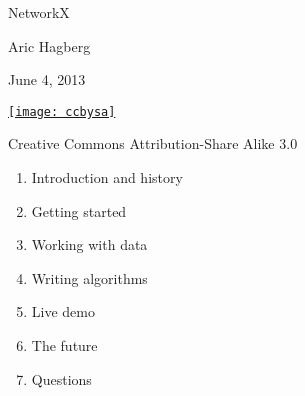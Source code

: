 \documentclass[xcolor=dvipsnames, 9pt]{beamer}
\begin{document}
\begin{frame}[plain]
\begin{center}

{\fontsize{50}{60}\selectfont 
{\color{title} NetworkX}}
\vspace{2cm}

{\fontsize{20}{25}\selectfont Aric Hagberg}
\vspace{0.2cm}

{\Large June 4, 2013}
\vspace{1cm}

\end{center}
\small
\href{http://creativecommons.org/licenses/by-sa/3.0/us/}{\texttt{[image: ccbysa]}}

Creative Commons Attribution-Share Alike 3.0 
\end{frame}

\begin{frame}


\LARGE
\begin{enumerate}
\item Introduction and history
\item Getting started
\item Working with data
\item Writing algorithms
\item Live demo
\item The future
\item Questions
\end{enumerate}

\end{frame}








\end{document}

